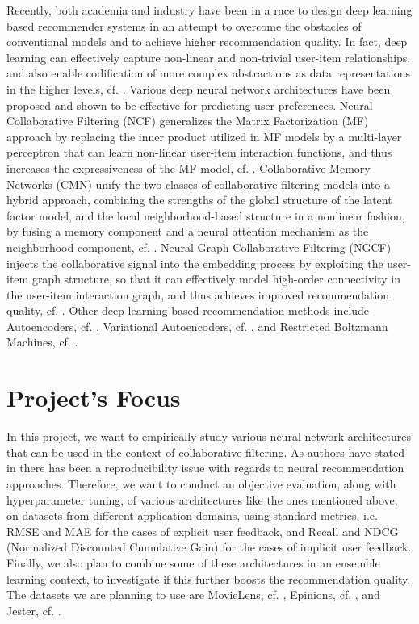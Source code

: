 Recently, both academia and industry have been in a race to design deep learning based recommender systems in an attempt to overcome the obstacles of conventional models and to achieve higher recommendation quality. In fact, deep learning can effectively capture non-linear and non-trivial user-item relationships, and also enable codification of more complex abstractions as data representations in the higher levels, cf. \cite{zhang2019deep}.
Various deep neural network architectures have been proposed and shown to be effective for predicting user preferences. Neural Collaborative Filtering (NCF) generalizes the Matrix Factorization (MF) approach by replacing the inner product utilized in MF models by a multi-layer perceptron that can learn non-linear user-item interaction functions, and thus increases the expressiveness of the MF model, cf. \cite{he2017neural}. Collaborative Memory Networks (CMN) unify the two classes of collaborative filtering models into a hybrid approach, combining the strengths of the global structure of the latent factor model, and the local neighborhood-based structure in a nonlinear fashion, by fusing a memory component and a neural attention mechanism as the neighborhood component, cf. \cite{ebesu2018collaborative}. Neural Graph Collaborative Filtering (NGCF) injects the collaborative signal into the embedding process by exploiting the user-item graph structure, so that it can effectively model high-order connectivity in the user-item interaction graph, and thus achieves improved recommendation quality, cf. \cite{wang2019neural}. Other deep learning based recommendation methods include Autoencoders, cf. \cite{sedhain2015autorec}, Variational Autoencoders, cf. \cite{liang2018variational}, and Restricted Boltzmann Machines, cf. \cite{salakhutdinov2007restricted}. 

\section*{Project's Focus}

In this project, we want to empirically study various neural network architectures that can be used in the context of collaborative filtering.
As authors have stated in \cite{dacrema2019we} there has been a reproducibility issue with regards to neural recommendation approaches. Therefore, we want to conduct an objective evaluation, along with hyperparameter tuning, of various architectures like the ones mentioned above, on datasets from different application domains, using standard metrics, i.e. RMSE and MAE for the cases of explicit user feedback, and Recall and NDCG (Normalized Discounted Cumulative Gain) for the cases of implicit user feedback. Finally, we also plan to combine some of these architectures in an ensemble learning context, to investigate if this further boosts the recommendation quality. The datasets we are planning to use are MovieLens, cf. \cite{harper2016movielens}, Epinions, cf. \cite{snapnets}, and Jester, cf. \cite{jester}.
